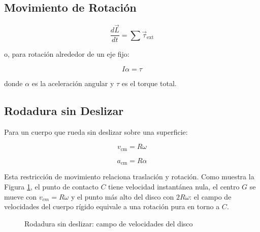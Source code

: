 \subsection*{Movimiento de Rotación}

$$\frac{d\vec{L}}{dt} = \sum \vec{\tau}_{\text{ext}}$$

o, para rotación alrededor de un eje fijo:

$$I\alpha = \tau$$

donde $\alpha$ es la aceleración angular y $\tau$ es el torque total.

\subsection*{Rodadura sin Deslizar}

Para un cuerpo que rueda sin deslizar sobre una superficie:

$$v_{\text{cm}} = R\omega$$

$$a_{\text{cm}} = R\alpha$$

Esta restricción de movimiento relaciona traslación y rotación. Como muestra la Figura \ref{fig:c4_intro_rodadura}, el punto de contacto $C$ tiene velocidad instantánea nula, el centro $G$ se mueve con $v_{cm}=R\omega$ y el punto más alto del disco con $2R\omega$: el campo de velocidades del cuerpo rígido equivale a una rotación pura en torno a $C$.

\begin{figure}[!ht]
    \centering
    \caption{Rodadura sin deslizar: campo de velocidades del disco}
    \label{fig:c4_intro_rodadura}
\end{figure}

